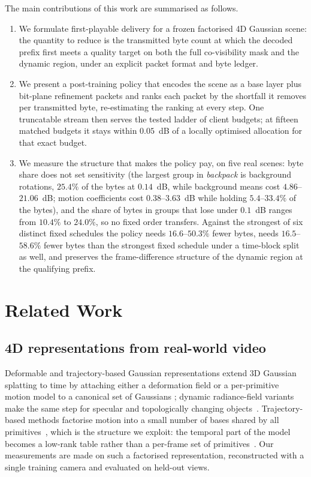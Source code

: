 \documentclass[lettersize,journal]{IEEEtran}
\begin{document}
The main contributions of this work are summarised as follows.
\begin{enumerate}
  \item We formulate first-playable delivery for a frozen factorised 4D Gaussian
  scene: the quantity to reduce is the transmitted byte count at which the
  decoded prefix first meets a quality target on both the full co-visibility mask
  and the dynamic region, under an explicit packet format and byte ledger.
  \item We present a post-training policy that encodes the scene as a base layer
  plus bit-plane refinement packets and ranks each packet by the shortfall it
  removes per transmitted byte, re-estimating the ranking at every step. One
  truncatable stream then serves the tested ladder of client budgets; at fifteen
  matched budgets it stays within $0.05$~dB of a locally optimised allocation for
  that exact budget.
  \item We measure the structure that makes the policy pay, on five real scenes:
  byte share does not set sensitivity (the largest group in \emph{backpack} is
  background rotations, $25.4\%$ of the bytes at $0.14$~dB, while background
  means cost $4.86$--$21.06$~dB; motion coefficients cost $0.38$--$3.63$~dB while
  holding $5.4$--$33.4\%$ of the bytes), and the share of bytes in groups that
  lose under $0.1$~dB ranges from $10.4\%$ to $24.0\%$, so no fixed order
  transfers. Against the strongest of six distinct fixed schedules the policy
  needs $16.6$--$50.3\%$ fewer bytes, needs $16.5$--$58.6\%$ fewer bytes than the
  strongest fixed schedule under a time-block split as well, and preserves the
  frame-difference structure of the dynamic region at the qualifying prefix.
\end{enumerate}

\section{Related Work}
\label{sec:related}

\subsection{4D representations from real-world video}
Deformable and trajectory-based Gaussian representations extend 3D Gaussian
splatting to time by attaching either a deformation field or a per-primitive
motion model to a canonical set of Gaussians
\cite{wu2024_4dgs,luiten2024_dynamic}; dynamic radiance-field variants make the
same step for specular and topologically changing
objects~\cite{li2022_nerfds}. Trajectory-based methods factorise motion
into a small number of bases shared by all primitives~\cite{wang2024_som}, which
is the structure we exploit: the temporal part of the model becomes a low-rank
table rather than a per-frame set of primitives~\cite{freeTimeGS2025}. Our
measurements are made on such a factorised representation, reconstructed with a
single training camera and evaluated on held-out views.
\end{document}
